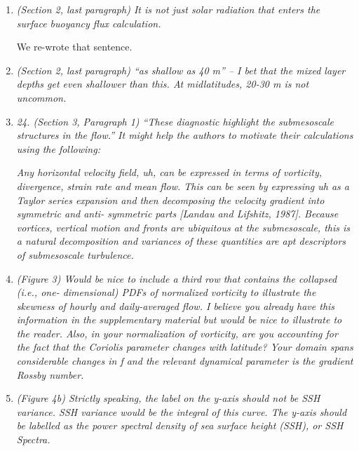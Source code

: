\documentclass[11pt]{article}
\begin{document}
\begin{enumerate}
\item {\it (Section 2, last paragraph) It is not just solar radiation that enters the surface buoyancy
      flux calculation.}

      We re-wrote that sentence.

\item {\it (Section 2, last paragraph) ``as shallow as 40 m'' – I bet that the mixed layer depths get
      even shallower than this. At midlatitudes, 20-30 m is not uncommon.}

\item {\it 24. (Section 3, Paragraph 1) ``These diagnostic highlight the submesoscale structures in
      the flow.'' It might help the authors to motivate their calculations using the following:}\\

\begin{description}
      {\it Any horizontal velocity field, uh, can be expressed in terms of vorticity, divergence,
      strain rate and mean flow. This can be seen by expressing uh as a Taylor series
      expansion and then decomposing the velocity gradient into symmetric and anti-
      symmetric parts [Landau and Lifshitz, 1987]. Because vortices, vertical motion and
      fronts are ubiquitous at the submesoscale, this is a natural decomposition and
      variances of these quantities are apt descriptors of submesoscale turbulence.}
\end{description}

\item {\it (Figure 3) Would be nice to include a third row that contains the collapsed (i.e., one-
      dimensional) PDFs of normalized vorticity to illustrate the skewness of hourly and
      daily-averaged flow. I believe you already have this information in the supplementary
      material but would be nice to illustrate to the reader. Also, in your normalization of
      vorticity, are you accounting for the fact that the Coriolis parameter changes with
      latitude? Your domain spans considerable changes in f and the relevant dynamical
      parameter is the gradient Rossby number.}

\item {\it (Figure 4b) Strictly speaking, the label on the y-axis should not be SSH variance. SSH
      variance would be the integral of this curve. The y-axis should be labelled as the
      power spectral density of sea surface height (SSH), or SSH Spectra.}\\


\end{enumerate}
\end{document}
